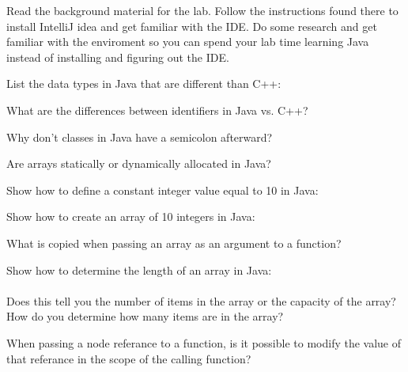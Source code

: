 \documentclass[../../main.tex]{subfiles}
\begin{document}
\begin{steps}
   \item Read the background material for the lab. Follow the instructions found there to install IntelliJ
      idea and get familiar with the IDE. Do some research and get familiar with the enviroment so you can
      spend your lab time learning Java instead of installing and figuring out the IDE.
   \item List the data types in Java that are different than C++:\\
      \vspace{1cm}
   \item What are the differences between identifiers in Java vs. C++?\\
      \vspace{1cm}
   \item Why don't classes in Java have a semicolon afterward?\\
      \vspace{1cm}
   \item Are arrays statically or dynamically allocated in Java?\\
      \vspace{1cm}
   \item Show how to define a constant integer value equal to 10 in Java:\\
      \vspace{1cm}
   \item Show how to create an array of 10 integers in Java:\\
      \vspace{1cm}
   \item What is copied when passing an array as an argument to a function?\\
      \vspace{1cm}
   \item Show how to determine the length of an array in Java:\\
      \vspace{1cm}\\
      Does this tell you the number of items in the array or the capacity of the array?\\
      How do you determine how many items are in the array?\\
      \vspace{1cm}
   \item When passing a node referance to a function, is it possible to modify the value of that referance in the scope of the calling function?\\
      \vspace{1cm}
\end{steps}
\end{document}
